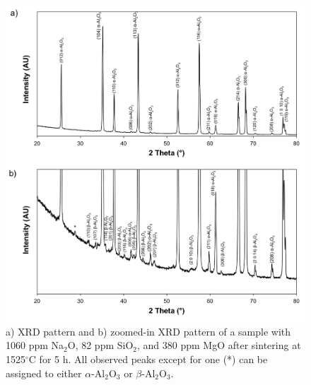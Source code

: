 \newpage
\begin{figure}[H]
	\centering
	\includegraphics[scale=0.6]{Chapter-5/Figures/Figure2.png}
	\caption{a) XRD pattern and b) zoomed-in XRD pattern of a sample with 1060 ppm Na$_{2}$O, 82 ppm SiO$_{2}$, and 380 ppm MgO after sintering at 1525$^{\circ}$C for 5 h. All observed peaks except for one (*) can be assigned to either $\alpha$-Al$_{2}$O$_{3}$ or $\beta$-Al$_{2}$O$_{3}$.}
	\label{Ch5-figure:Figure2}
\end{figure}

